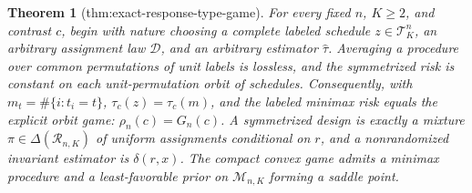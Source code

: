 \documentclass{article}
\newtheorem{theorem}{Theorem}
\begin{document}
\begin{theorem}[thm:exact-response-type-game]\label{thm:exact-response-type-game}
For every fixed \(n\), \(K\ge2\), and contrast \(c\), begin with nature choosing a complete labeled schedule \(z\in\mathcal T_K^n\), an arbitrary assignment law \(\mathcal D\), and an arbitrary estimator \(\widehat\tau\). Averaging a procedure over common permutations of unit labels is lossless, and the symmetrized risk is constant on each unit-permutation orbit of schedules. Consequently, with \(m_t=\#\{i:t_i=t\}\), \(\tau_c(z)=\tau_c(m)\), and the labeled minimax risk equals the explicit orbit game: \(\rho_n(c)=G_n(c)\). A symmetrized design is exactly a mixture \(\pi\in\Delta(\mathcal R_{n,K})\) of uniform assignments conditional on \(r\), and a nonrandomized invariant estimator is \(\delta(r,x)\). The compact convex game admits a minimax procedure and a least-favorable prior on \(\mathcal M_{n,K}\) forming a saddle point.
\end{theorem}
\end{document}
